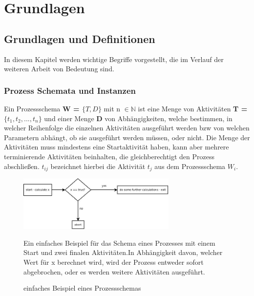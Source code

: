 
\chapter{Grundlagen} %

\label{Chapter4} %



\section{Grundlagen und Definitionen}
In diesem Kapitel werden wichtige Begriffe vorgestellt, die im Verlauf der weiteren Arbeit von Bedeutung sind.

\subsection{Prozess Schemata und Instanzen}

Ein Prozessschema \textbf{W = $\{T,D\}$} mit n $\in \mathbb{N}$ ist eine Menge von Aktivitäten \textbf{T = $\{t_1,t_2,...,t_n\}$} und einer Menge \textbf{D} von Abhängigkeiten, welche bestimmen, in welcher Reihenfolge die einzelnen Aktivitäten ausgeführt werden bzw von welchen Parametern abhängt, ob sie ausgeführt werden müssen, oder nicht. Die Menge der Aktivitäten muss mindestens eine Startaktivität haben, kann aber mehrere terminierende Aktivitäten beinhalten, die gleichberechtigt den Prozess abschließen.
$t_{ij}$ bezeichnet hierbei die Aktivität $t_j$ aus dem Prozessschema $W_i$. \\

\begin{figure}[ht]
	\centering
  \includegraphics[width=0.7\textwidth]{Figures/sampleW}
	\caption{einfaches Beispiel eines Prozessschemas}
Ein einfaches Beispiel für das Schema eines Prozesses mit einem Start und zwei finalen Aktivitäten.In Abhängigkeit davon, welcher Wert für x berechnet wird, wird der Prozess entweder sofort abgebrochen, oder es werden weitere Aktivitäten ausgeführt.
	\label{fig2}
\end{figure}

